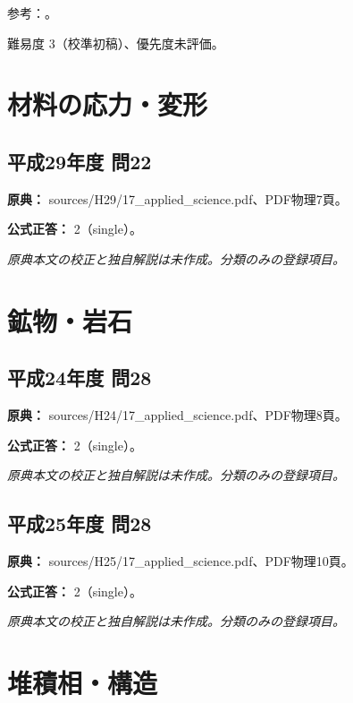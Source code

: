 \par 参考：\cite{jseg_engineering_faq,kyoto_deep2018,sabo_deep2014,jsce_swelling2010,aist_accretion2026}。

\par 難易度 3（校準初稿）、優先度未評価。

\section{材料の応力・変形}

\subsection{平成29年度 問22}
\label{q:h29-reg-applied-22}

\noindent\textbf{原典：} sources/H29/17\_applied\_science.pdf、PDF物理7頁。

\textbf{公式正答：} 2（single）。

\par\textit{原典本文の校正と独自解説は未作成。分類のみの登録項目。}

\section{鉱物・岩石}

\subsection{平成24年度 問28}
\label{q:h24-reg-applied-28}

\noindent\textbf{原典：} sources/H24/17\_applied\_science.pdf、PDF物理8頁。

\textbf{公式正答：} 2（single）。

\par\textit{原典本文の校正と独自解説は未作成。分類のみの登録項目。}

\subsection{平成25年度 問28}
\label{q:h25-reg-applied-28}

\noindent\textbf{原典：} sources/H25/17\_applied\_science.pdf、PDF物理10頁。

\textbf{公式正答：} 2（single）。

\par\textit{原典本文の校正と独自解説は未作成。分類のみの登録項目。}

\section{堆積相・構造}

